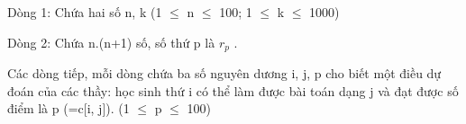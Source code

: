 Dòng 1: Chứa hai số n, k (1  $\le$  n  $\le$  100; 1  $\le$  k  $\le$  1000)

Dòng 2: Chứa n.(n+1) số, số thứ p là $r_{p}$ .

Các dòng tiếp, mỗi dòng chứa ba số nguyên dương i, j, p cho biết một điều dự đoán của các thầy: học sinh thứ i có thể làm được bài toán dạng j và đạt được số điểm là p (=c[i, j]). (1  $\le$  p  $\le$  100)
